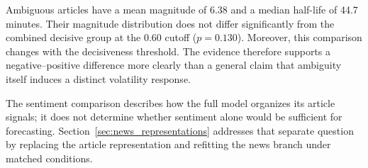 Ambiguous articles have a mean magnitude of 6.38 and a median half-life
of 44.7 minutes. Their magnitude distribution does not differ
significantly from the combined decisive group at the 0.60 cutoff
($p=0.130$). Moreover, this comparison changes with the decisiveness
threshold. The evidence therefore supports a negative--positive
difference more clearly than a general claim that ambiguity itself
induces a distinct volatility response.

The sentiment comparison describes how the full model organizes its
article signals; it does not determine whether sentiment alone would
be sufficient for forecasting. Section~\ref{sec:news_representations}
addresses that separate question by replacing the article
representation and refitting the news branch under matched conditions.
